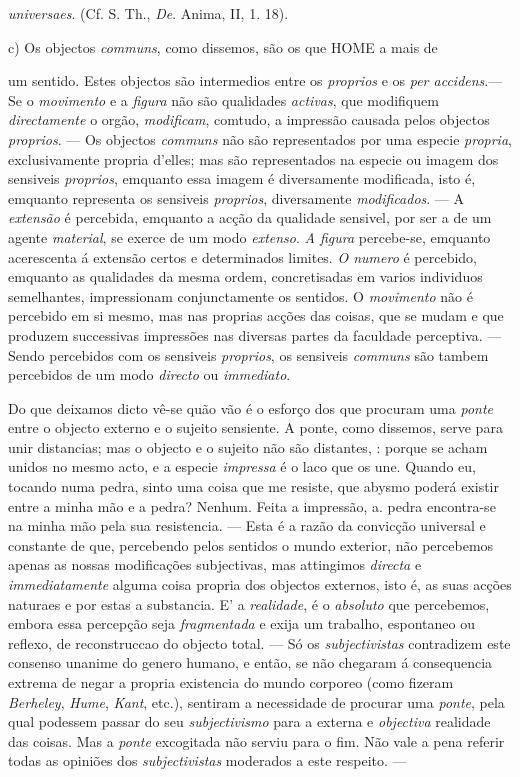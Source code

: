 \emph{universaes}. (Cf. S. Th., \emph{De}. Anima, II, 1. 18).\par c) Os objectos \emph{communs}, como dissemos, são os que HOME a mais de\par um sentido. Estes objectos são intermedios entre os \emph{proprios} e os \emph{per accidens}.--- Se o \emph{movimento} e a \emph{figura} não são qualidades \emph{activas}, que modifiquem \emph{directamente} o orgão, \emph{modificam}, comtudo, a impressão causada pelos objectos \emph{proprios}. --- Os objectos \emph{communs} não são representados por uma especie \emph{propria}, exclusivamente propria d'elles; mas são representados na especie ou imagem dos sensiveis \emph{proprios}, emquanto essa imagem é diversamente modificada, isto é, emquanto representa os sensiveis \emph{proprios}, diversamente \emph{modificados}. --- A \emph{extensão} é percebida, emquanto a acção da qualidade sensivel, por ser a de um agente \emph{material}, se exerce de um modo \emph{extenso}. \emph{A figura} percebe-se, emquanto acerescenta á extensão certos e determinados limites. \emph{O numero} é percebido, emquanto as qualidades da mesma ordem, concretisadas em varios individuos semelhantes, impressionam conjunctamente os sentidos. O \emph{movimento} não é percebido em si mesmo, mas nas proprias acções das coisas, que se mudam e que produzem successivas impressões nas diversas partes da faculdade perceptiva. --- Sendo percebidos com os sensiveis \emph{proprios}, os sensiveis \emph{communs} são tambem percebidos de um modo \emph{directo} ou \emph{immediato}.\par Do que deixamos dicto vê-se quão vão é o esforço dos que procuram uma \emph{ponte} entre o objecto externo e o sujeito sensiente. A ponte, como dissemos, serve para unir distancias; mas o objecto e o sujeito não são distantes, : porque se acham unidos no mesmo acto, e a especie \emph{impressa} é o laco que os une. Quando eu, tocando numa pedra, sinto uma coisa que me resiste, que abysmo poderá existir entre a minha mão e a pedra? Nenhum. Feita a impressão, a. pedra encontra-se na minha mão pela sua resistencia. --- Esta é a razão da convicção universal e constante de que, percebendo pelos sentidos o mundo exterior, não percebemos apenas as nossas modificações subjectivas, mas attingimos \emph{directa} e \emph{immediatamente} alguma coisa propria dos objectos externos, isto é, as suas acções naturaes e por estas a substancia. E' a \emph{realidade}, é o \emph{absoluto} que percebemos, embora essa percepção seja \textbar{} \emph{fragmentada} e exija um trabalho, espontaneo ou reflexo, de reconstruccao \textbar{} do objecto total. --- Só os \emph{subjectivistas} contradizem este consenso unanime \textbar{} do genero humano, e então, se não chegaram á consequencia extrema de \textbar{} negar a propria existencia do mundo corporeo (como fizeram \emph{Berheley}, \emph{Hume}, \textbar{} \textbar{} \emph{Kant}, etc.), sentiram a necessidade de procurar uma \emph{ponte}, pela qual podessem \textbar{} passar do seu \emph{subjectivismo} para a externa e \emph{objectiva} realidade das coisas. \textbar{} Mas a \emph{ponte} excogitada não serviu para o fim. Não vale a pena referir todas as opiniões dos \emph{subjectivistas} moderados a este respeito. --- 